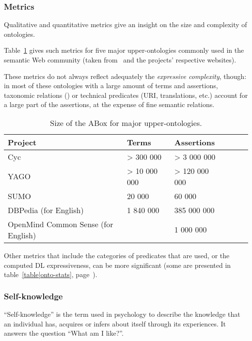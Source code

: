 \subsubsection{Metrics}

Qualitative and quantitative metrics give an insight on the size and
complexity of ontologies.

Table~\ref{table|upper_onto_metrics} gives such metrics for five major
upper-ontologies commonly used in the semantic Web community (taken
from~\cite{Mascardi2007} and the projects' respective websites).

These metrics do not always reflect adequately the \emph{expressive
complexity}, though: in most of these ontologies with a large amount of terms
and assertions, taxonomic relations () or technical predicates
(URI, translations, etc.) account for a large part of the assertions, at the
expense of fine semantic relations.

\begin{table}
\begin{center}

\begin{tabular}{llllll}
\toprule
{\bf Project} & {\bf Terms} & {\bf Assertions} \\
\midrule
Cyc & > 300 000 & > 3 000 000 & \\
YAGO & > 10 000 000 & > 120 000 000 \\
SUMO & 20 000 & 60 000 \\
DBPedia (for English) & 1 840 000 & 385 000 000\\
OpenMind Common Sense (for English) & & 1 000 000\\
\bottomrule

\end{tabular}
\end{center}
\caption{Size of the ABox for major upper-ontologies.}
\label{table|upper_onto_metrics}
\end{table}

Other metrics that include the categories of predicates that are used, or the
computed DL expressiveness, can be more significant (some are presented in
table~\ref{table|onto-stats}, page~\pageref{table|onto-stats}).

\subsubsection{Self-knowledge}

``Self-knowledge'' is the term used in psychology to describe the knowledge
that an individual has, acquires or infers about itself through its
experiences. It answers the question ``What am I like?''.

